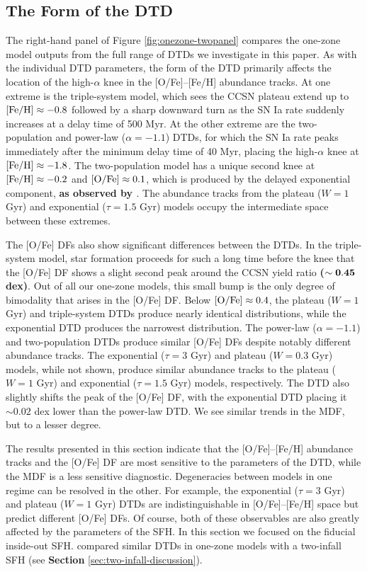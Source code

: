 \documentclass[twocolumn,twocolappendix,linenumbers]{aastex631}
\begin{document}
\subsection{\bf The Form of the DTD}
\label{sec:onezone-dtd-form}

The right-hand panel of Figure \ref{fig:onezone-twopanel} compares the one-zone model outputs from the full range of DTDs we investigate in this paper. As with the individual DTD parameters, the form of the DTD primarily affects the location of the high-$\alpha$ knee in the [O/Fe]--[Fe/H] abundance tracks. At one extreme is the triple-system model, which sees the CCSN plateau extend up to ${\rm [Fe/H]}\approx-0.8$ followed by a sharp downward turn as the SN Ia rate suddenly increases at a delay time of 500 Myr. 
At the other extreme are the two-population and power-law ($\alpha=-1.1$) DTDs, for which the SN Ia rate peaks immediately after the minimum delay time of 40 Myr, placing the high-$\alpha$ knee at ${\rm [Fe/H]}\approx-1.8$. The two-population model has a unique second knee at ${\rm [Fe/H]}\approx-0.2$ and ${\rm [O/Fe]}\approx0.1$, which is produced by the delayed exponential component, {\bf as observed by \citet{Vincenzo2017-ChemicalEvolution}}. The abundance tracks from the plateau ($W=1$ Gyr) and exponential ($\tau=1.5$ Gyr) models occupy the intermediate space between these extremes. 

The [O/Fe] DFs also show significant differences between the DTDs. In the triple-system model, star formation proceeds for such a long time before the knee that the [O/Fe] DF shows a slight second peak around the CCSN yield ratio {\bf ($\bf \sim0.45$ dex)}. Out of all our one-zone models, this small bump is the only degree of bimodality that arises in the [O/Fe] DF. Below ${\rm [O/Fe]}\approx0.4$, the plateau ($W=1$ Gyr) and triple-system DTDs produce nearly identical distributions, while the exponential DTD produces the narrowest distribution. The power-law ($\alpha=-1.1$) and two-population DTDs produce similar [O/Fe] DFs despite notably different abundance tracks. The exponential ($\tau=3$ Gyr) and plateau ($W=0.3$ Gyr) models, while not shown, produce similar abundance tracks to the plateau ($W=1$ Gyr) and exponential ($\tau=1.5$ Gyr) models, respectively.
The DTD also slightly shifts the peak of the [O/Fe] DF, with the exponential DTD placing it $\sim 0.02$ dex lower than the power-law DTD. We see similar trends in the MDF, but to a lesser degree.

The results presented in this section indicate that the [O/Fe]--[Fe/H] abundance tracks and the [O/Fe] DF are most sensitive to the parameters of the DTD, while the MDF is a less sensitive diagnostic. Degeneracies between models in one regime can be resolved in the other. For example, the exponential ($\tau=3$ Gyr) and plateau ($W=1$ Gyr) DTDs are indistinguishable in [O/Fe]--[Fe/H] space but predict different [O/Fe] DFs. Of course, both of these observables are also greatly affected by the parameters of the SFH. In this section we focused on the fiducial inside-out SFH. \citet{Palicio2023-AnalyticDTD} compared similar DTDs in one-zone models with a two-infall SFH (see {\bf Section} \ref{sec:two-infall-discussion}).
\end{document}
